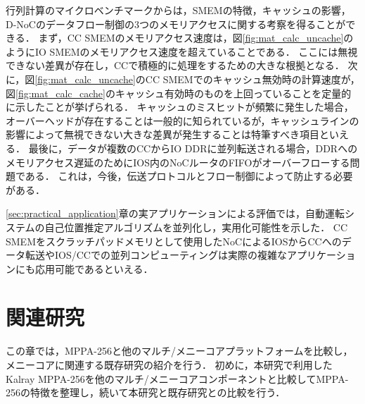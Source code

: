 \documentclass[submit,techrep]{ipsj_v2/UTF8/ipsj}
\begin{document}

行列計算のマイクロベンチマークからは，SMEMの特徴，キャッシュの影響，D-NoCのデータフロー制御の3つのメモリアクセスに関する考察を得ることができる．
まず，CC SMEMのメモリアクセス速度は，図\ref{fig:mat_calc_uncache}のようにIO SMEMのメモリアクセス速度を超えていることである．
ここには無視できない差異が存在し，CCで積極的に処理をするための大きな根拠となる．
次に，図\ref{fig:mat_calc_uncache}のCC SMEMでのキャッシュ無効時の計算速度が，図\ref{fig:mat_calc_cache}のキャッシュ有効時のものを上回っていることを定量的に示したことが挙げられる．
キャッシュのミスヒットが頻繁に発生した場合，オーバーヘッドが存在することは一般的に知られているが，キャッシュラインの影響によって無視できない大きな差異が発生することは特筆すべき項目といえる．
最後に，データが複数のCCからIO DDRに並列転送される場合，DDRへのメモリアクセス遅延のためにIOS内のNoCルータのFIFOがオーバーフローする問題である．
これは，今後，伝送プロトコルとフロー制御によって防止する必要がある．

\ref{sec:practical_application}章の実アプリケーションによる評価では，自動運転システムの自己位置推定アルゴリズムを並列化し，実用化可能性を示した．
CC SMEMをスクラッチパッドメモリとして使用したNoCによるIOSからCCへのデータ転送やIOS/CCでの並列コンピューティングは実際の複雑なアプリケーションにも応用可能であるといえる．

\section{関連研究}
\label{sec:related_work}
この章では，MPPA-256と他のマルチ/メニーコアプラットフォームを比較し，メニーコアに関連する既存研究の紹介を行う．
初めに，本研究で利用したKalray MPPA-256を他のマルチ/メニーコアコンポーネントと比較してMPPA-256の特徴を整理し，続いて本研究と既存研究との比較を行う．
\end{document}
